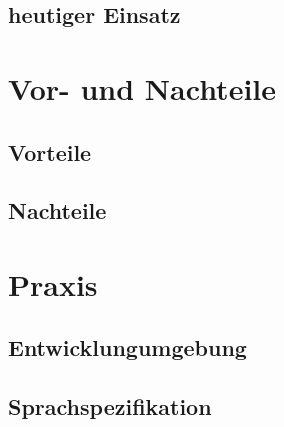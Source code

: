 \documentclass{beamer}
\begin{document}
\subsection{heutiger Einsatz}

\section{Vor- und Nachteile}

\subsection{Vorteile}

\subsection{Nachteile}

\section{Praxis}

\subsection{Entwicklungumgebung}

\subsection{Sprachspezifikation}
\end{document}
